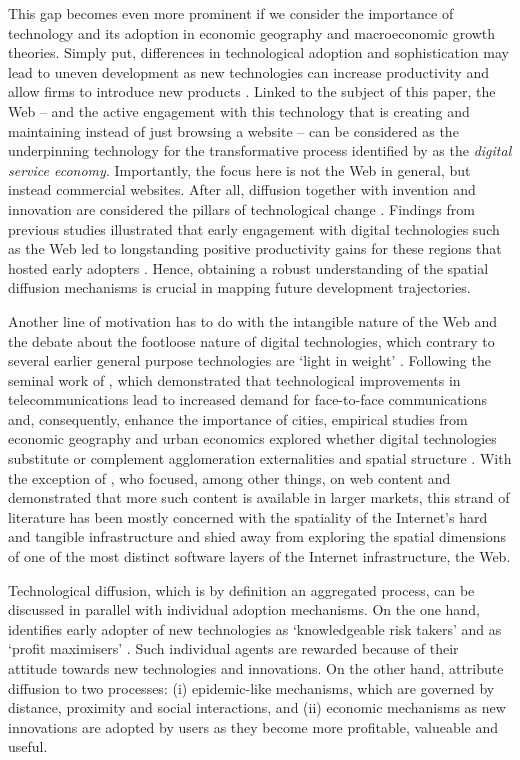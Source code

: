\documentclass[
  authoryear,
  preprint,
  3p]{elsarticle}
\begin{document}
This gap becomes even more prominent if we consider the importance of
technology and its adoption in economic geography and macroeconomic
growth theories. Simply put, differences in technological adoption and
sophistication may lead to uneven development as new technologies can
increase productivity and allow firms to introduce new products
\citep{solow1957technical, aghion1990model, kemeny2011international}.
Linked to the subject of this paper, the Web -- and the active
engagement with this technology that is creating and maintaining instead
of just browsing a website -- can be considered as the underpinning
technology for the transformative process identified by
\citet{capello2024nexus} as the \emph{digital service economy}.
Importantly, the focus here is not the Web in general, but instead
commercial websites. After all, diffusion together with invention and
innovation are considered the pillars of technological change
\citep{das2022diffusion}. Findings from previous studies illustrated
that early engagement with digital technologies such as the Web led to
longstanding positive productivity gains for these regions that hosted
early adopters \citep{tranosuk}. Hence, obtaining a robust understanding
of the spatial diffusion mechanisms is crucial in mapping future
development trajectories.

Another line of motivation has to do with the intangible nature of the
Web and the debate about the footloose nature of digital technologies,
which contrary to several earlier general purpose technologies are
`light in weight' \citep{coyle1999weightless}. Following the seminal
work of \citet{gaspar1998information}, which demonstrated that
technological improvements in telecommunications lead to increased
demand for face-to-face communications and, consequently, enhance the
importance of cities, empirical studies from economic geography and
urban economics explored whether digital technologies substitute or
complement agglomeration externalities and spatial structure
\citep{kolko_death_2000, ioannides2008effect, tranos2021ubiquitous}.
With the exception of \citet{sinai2004geography}, who focused, among
other things, on web content and demonstrated that more such content is
available in larger markets, this strand of literature has been mostly
concerned with the spatiality of the Internet's hard and tangible
infrastructure and shied away from exploring the spatial dimensions of
one of the most distinct software layers of the Internet infrastructure,
the Web.

Technological diffusion, which is by definition an aggregated process,
can be discussed in parallel with individual adoption mechanisms. On the
one hand, \citet{rogers2010diffusion} identifies early adopter of new
technologies as `knowledgeable risk takers' and \citet{griliches1957} as
`profit maximisers' \citep{ding2010modeling}. Such individual agents are
rewarded because of their attitude towards new technologies and
innovations. On the other hand, \citet{perkins2011internet} attribute
diffusion to two processes: (i) epidemic-like mechanisms, which are
governed by distance, proximity and social interactions, and (ii)
economic mechanisms as new innovations are adopted by users as they
become more profitable, valueable and useful.
\end{document}
